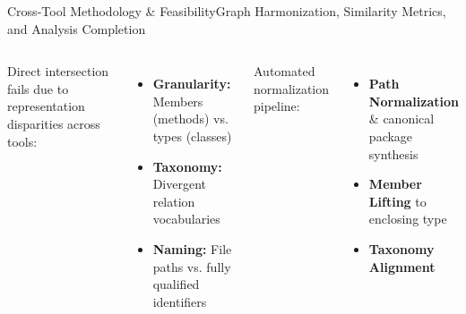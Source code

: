 \documentclass[aspectratio=169,10pt]{beamer}
\begin{document}
\begin{frame}{Cross-Tool Methodology \& Feasibility}{Graph Harmonization, Similarity Metrics, and Analysis Completion}
  \begin{columns}[T,onlytextwidth]
      \par\vspace{0.15em}
      \small
      Direct intersection fails due to representation disparities across tools:\par
      \begin{itemize}
        \item \textbf{Granularity:} Members (methods) vs. types (classes)\par
        \item \textbf{Taxonomy:} Divergent relation vocabularies\par
        \item \textbf{Naming:} File paths vs. fully qualified identifiers\par
      \end{itemize}
      \vspace{0.45em}

      \par\vspace{0.15em}
      \small
      Automated normalization pipeline:\par
      \begin{itemize}
        \item \textbf{Path Normalization} \& canonical package synthesis\par\vspace{0.15em}
        \item \textbf{Member Lifting} to enclosing type\par\vspace{0.15em}
        \item \textbf{Taxonomy Alignment} \par
      \end{itemize}
      \vspace{0.45em}

     


\end{columns}
\end{frame}
\end{document}
